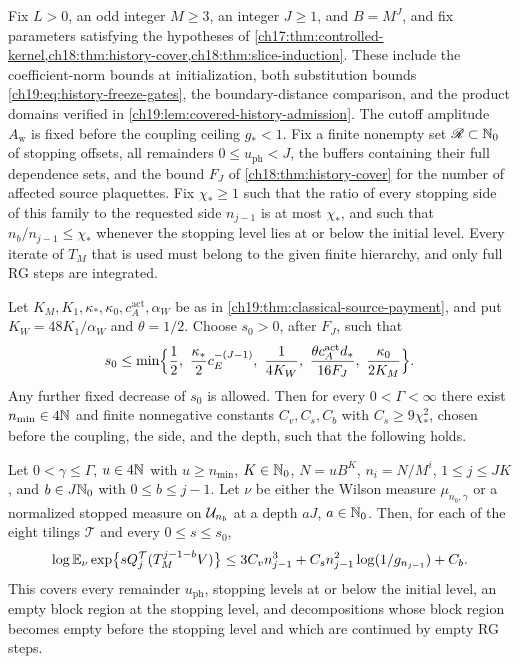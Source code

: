 \begin{theorem}\label{ch19:thm:all-phase-window}
Fix $L>0$, an odd integer $M\ge3$, an integer $J\ge1$, and $B=M^J$, and fix parameters satisfying the hypotheses of \cref{ch17:thm:controlled-kernel,ch18:thm:history-cover,ch18:thm:slice-induction}. These include the coefficient-norm bounds at initialization, both substitution bounds \eqref{ch19:eq:history-freeze-gates}, the boundary-distance comparison, and the product domains verified in \cref{ch19:lem:covered-history-admission}. The cutoff amplitude $A_{\mathrm w}$ is fixed before the coupling ceiling $g_*<1$. Fix a finite nonempty set $\mathscr R\subset\mathbb N_0$ of stopping offsets, all remainders $0\le u_{\mathrm{ph}}<J$, the buffers containing their full dependence sets, and the bound $F_J$ of \cref{ch18:thm:history-cover} for the number of affected source plaquettes. Fix $\chi_*\ge1$ such that the ratio of every stopping side of this family to the requested side $n_{j-1}$ is at most $\chi_*$, and such that $n_b/n_{j-1}\le\chi_*$ whenever the stopping level lies at or below the initial level. Every iterate of $T_M$ that is used must belong to the given finite hierarchy, and only full RG steps are integrated.

Let $K_M,K_1,\kappa_*,\kappa_0,c_A^{\mathrm{act}},\alpha_W$ be as in \cref{ch19:thm:classical-source-payment}, and put $K_W=48K_1/\alpha_W$ and $\theta=1/2$. Choose $s_0>0$, after $F_J$, such that
\[
 s_0\le\min\Bigl\{\frac12,\ \frac{\kappa_*}2c_E^{-(J-1)},\ \frac1{4K_W},\
 \frac{\theta c_A^{\mathrm{act}}d_*}{16F_J},\ \frac{\kappa_0}{2K_M}\Bigr\}.
\]
Any further fixed decrease of $s_0$ is allowed. Then for every $0<\Gamma<\infty$ there exist $n_{\min}\in4\mathbb N$ and finite nonnegative constants $C_v,C_s,C_b$ with $C_s\ge9\chi_*^2$, chosen before the coupling, the side, and the depth, such that the following holds.

Let $0<\gamma\le\Gamma$, $u\in4\mathbb N$ with $u\ge n_{\min}$, $K\in\mathbb N_0$, $N=uB^K$, $n_i=N/M^i$, $1\le j\le JK$, and $b\in J\mathbb N_0$ with $0\le b\le j-1$. Let $\nu$ be either the Wilson measure $\mu_{n_b,\gamma}$ or a normalized stopped measure on $\mathcal U_{n_b}$ at a depth $aJ$, $a\in\mathbb N_0$. Then, for each of the eight tilings $\mathcal T$ and every $0\le s\le s_0$,
\[
 \log\mathbb E_\nu\exp\bigl\{sQ_j^{\mathcal T}(T_M^{j-1-b}V)\bigr\}
 \le3C_vn_{j-1}^3+C_sn_{j-1}^2\log(1/g_{n_{j-1}})+C_b.
\]
This covers every remainder $u_{\mathrm{ph}}$, stopping levels at or below the initial level, an empty block region at the stopping level, and decompositions whose block region becomes empty before the stopping level and which are continued by empty RG steps.


\end{theorem}
